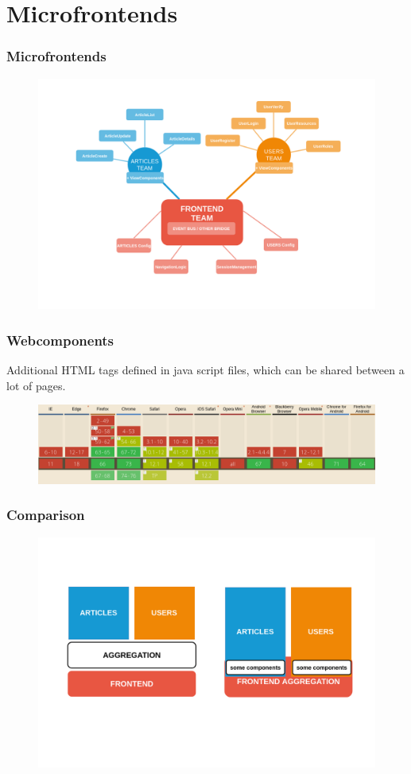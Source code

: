 \section{Microfrontends}

\begin{frame}
\frametitle{Microfrontends}
	\begin{figure}
		\centering
		\includegraphics[width=0.9\linewidth]{pictures/microfrontends-knowledge.png}		
		\label{fig:microservices}
	\end{figure}
\end{frame}

\begin{frame}
\frametitle{Webcomponents}
Additional HTML tags defined in java script files, which can be shared between a lot of pages.
\begin{figure}
	\centering
	\includegraphics[width=0.9\linewidth]{pictures/webcomponents-support.png}		
	\label{fig:microservices}
\end{figure}
\end{frame}

\begin{frame}
\frametitle{Comparison}
\begin{figure}
	\centering
	\includegraphics[width=0.9\linewidth]{pictures/microfrontends-vs-microservices.png}		
	\label{fig:vs}
\end{figure}
\end{frame}